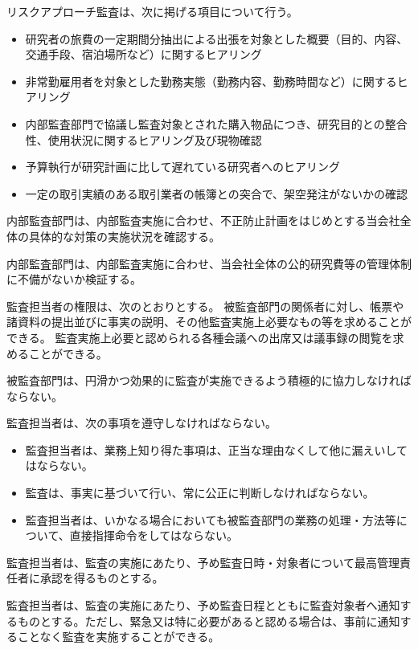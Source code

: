 \documentclass[10pt,a4paper,uplatex]{jsarticle}
\begin{document}
リスクアプローチ監査は、次に掲げる項目について行う。
\begin{itemize}
	\item 研究者の旅費の一定期間分抽出による出張を対象とした概要（目的、内容、交通手段、宿泊場所など）に関するヒアリング
	\item 非常勤雇用者を対象とした勤務実態（勤務内容、勤務時間など）に関するヒアリング
	\item 内部監査部門で協議し監査対象とされた購入物品につき、研究目的との整合性、使用状況に関するヒアリング及び現物確認
	\item 予算執行が研究計画に比して遅れている研究者へのヒアリング
	\item 一定の取引実績のある取引業者の帳簿との突合で、架空発注がないかの確認
\end{itemize}

内部監査部門は、内部監査実施に合わせ、不正防止計画をはじめとする当会社全体の具体的な対策の実施状況を確認する。

内部監査部門は、内部監査実施に合わせ、当会社全体の公的研究費等の管理体制に不備がないか検証する。

監査担当者の権限は、次のとおりとする。
\term 被監査部門の関係者に対し、帳票や諸資料の提出並びに事実の説明、その他監査実施上必要なもの等を求めることができる。
\term 監査実施上必要と認められる各種会議への出席又は議事録の閲覧を求めることができる。

被監査部門は、円滑かつ効果的に監査が実施できるよう積極的に協力しなければならない。

監査担当者は、次の事項を遵守しなければならない。
\begin{itemize}
	\item 監査担当者は、業務上知り得た事項は、正当な理由なくして他に漏えいしてはならない。
	\item 監査は、事実に基づいて行い、常に公正に判断しなければならない。
	\item 監査担当者は、いかなる場合においても被監査部門の業務の処理・方法等について、直接指揮命令をしてはならない。
\end{itemize}

監査担当者は、監査の実施にあたり、予め監査日時・対象者について最高管理責任者に承認を得るものとする。

監査担当者は、監査の実施にあたり、予め監査日程とともに監査対象者へ通知するものとする。ただし、緊急又は特に必要があると認める場合は、事前に通知することなく監査を実施することができる。
\end{document}
